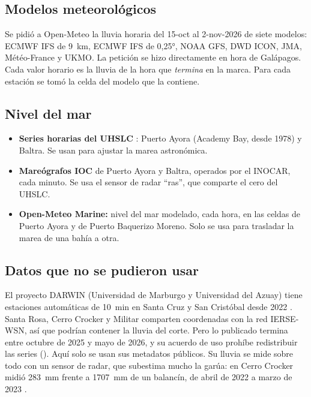 \documentclass{sosg-informe}
\begin{document}
\subsection{Modelos meteorológicos}
Se pidió a Open-Meteo \citep{zippenfenig2023} la lluvia horaria del 15-oct al 2-nov-2026 de siete modelos: ECMWF IFS de 9~km, ECMWF IFS de 0,25°, NOAA GFS, DWD ICON, JMA, Météo-France y UKMO. La petición se hizo directamente en hora de Galápagos. Cada valor horario es la lluvia de la hora que \emph{termina} en la marca. Para cada estación se tomó la celda del modelo que la contiene.

\subsection{Nivel del mar}
\begin{itemize}
  \item \textbf{Series horarias del UHSLC} \citep{caldwell2015}: Puerto Ayora (Academy Bay, desde 1978) y Baltra. Se usan para ajustar la marea astronómica.
  \item \textbf{Mareógrafos IOC} \citep{ioc2026} de Puerto Ayora y Baltra, operados por el INOCAR, cada minuto. Se usa el sensor de radar \enquote{ras}, que comparte el cero del UHSLC.
  \item \textbf{Open-Meteo Marine:} nivel del mar modelado, cada hora, en las celdas de Puerto Ayora y de Puerto Baquerizo Moreno. Solo se usa para trasladar la marea de una bahía a otra.
\end{itemize}

\subsection{Datos que no se pudieron usar}
El proyecto DARWIN (Universidad de Marburgo y Universidad del Azuay) tiene estaciones automáticas de 10~min en Santa Cruz y San Cristóbal desde 2022 \citep{darwin_sc,darwin_scb}. Santa Rosa, Cerro Crocker y Militar comparten coordenadas con la red IERSE-WSN, así que podrían contener la lluvia del corte. Pero lo publicado termina entre octubre de 2025 y mayo de 2026, y su acuerdo de uso prohíbe redistribuir las series (). Aquí solo se usan sus metadatos públicos. Su lluvia se mide sobre todo con un sensor de radar, que subestima mucho la garúa: en Cerro Crocker midió 283~mm frente a 1707~mm de un balancín, de abril de 2022 a marzo de 2023 \citep{schmidt2025}.

\end{document}
